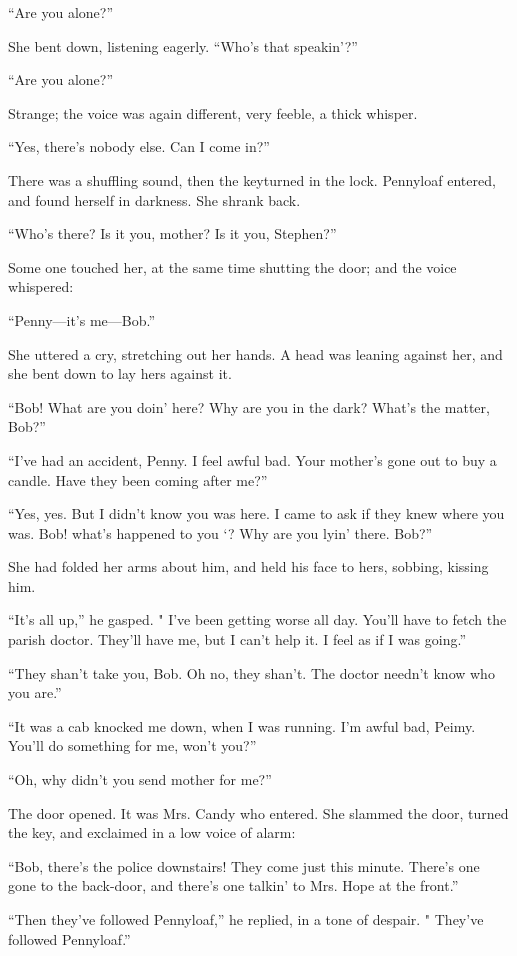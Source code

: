 ``Are you alone?''

She bent down, listening eagerly. ``Who's that speakin'?''

``Are you alone?''

Strange; the voice was again different, very feeble, a thick whisper.

{}``Yes, there's nobody else. Can I come in?''

There was a shuffling sound, then the keyturned in the lock. Pennyloaf
entered, and found herself in darkness. She shrank back.

``Who's there? Is it you, mother? Is it you, Stephen?''

Some one touched her, at the same time shutting the door; and the voice
whispered:

``Penny---it's me---Bob.''

She uttered a cry, stretching out her hands. A head was leaning against
her, and she bent down to lay hers against it.

``Bob! What are you doin' here? Why are you in the dark? What's the
matter, Bob?''

``I've had an accident, Penny. I feel awful bad. Your mother's gone out
to buy a candle. Have they been coming after me?''

``Yes, yes. But I didn't know you was here. I came to ask if they knew
where you was. Bob! what's happened to you `? Why are you lyin' there.
Bob?''

She had folded her arms about him, and held his face to hers, sobbing,
kissing him.

``It's all up,'' he gasped. " I've been getting worse all day. You'll
have to fetch the parish {}doctor. They'll have me, but I can't help it.
I feel as if I was going.''

``They shan't take you, Bob. Oh no, they shan't. The doctor needn't know
who you are.''

``It was a cab knocked me down, when I was running. I'm awful bad,
Peimy. You'll do something for me, won't you?''

``Oh, why didn't you send mother for me?''

The door opened. It was Mrs. Candy who entered. She slammed the door,
turned the key, and exclaimed in a low voice of alarm:

``Bob, there's the police downstairs! They come just this minute.
There's one gone to the back-door, and there's one talkin' to Mrs. Hope
at the front.''

``Then they've followed Pennyloaf,'' he replied, in a tone of despair. "
They've followed Pennyloaf.''

